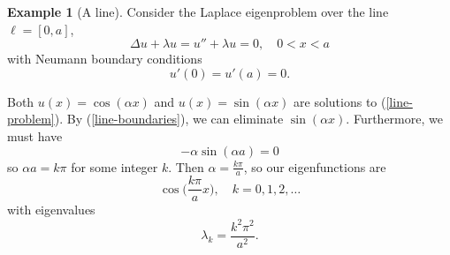 \documentclass{article}
\numberwithin{equation}{section}
\theoremstyle{definition}
\newtheorem{exmp}[thm]{Example}
\begin{document}
\begin{exmp}[A line]\label{laplace-line}
Consider the Laplace eigenproblem over the line $\ell = [0,a]$,
\begin{equation}\label{line-problem}
\Delta u + \lambda u = u'' + \lambda u = 0, \quad 0 < x < a
\end{equation}
with Neumann boundary conditions
\begin{equation}\label{line-boundaries}
u'(0) = u'(a) = 0.
\end{equation}

Both $u(x) = \cos(\alpha x)$ and $u(x) = \sin(\alpha x)$ are solutions to (\ref{line-problem}). By (\ref{line-boundaries}), we can eliminate $\sin(\alpha x)$. Furthermore, we must have
\begin{equation}
    -\alpha \sin(\alpha a) = 0
\end{equation}
so $\alpha a = k\pi$ for some integer $k$. Then $\alpha = \frac{k\pi}{a}$, so our eigenfunctions are
\begin{equation}
    \cos\Big(\frac{k\pi}{a} x\Big), \quad k = 0, 1, 2, \ldots
\end{equation}
with eigenvalues
\begin{equation}
    \lambda_k = \frac{k^2\pi^2}{a^2}. 
\end{equation}
\end{exmp}
\end{document}
